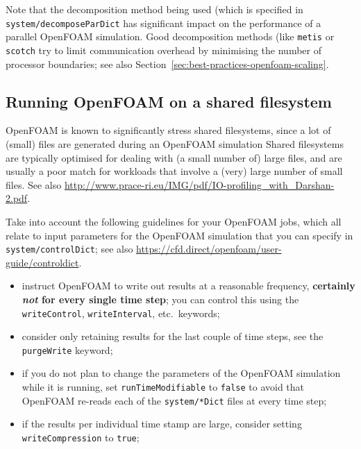 Note that the decomposition method being used (which is specified in {\small\texttt{system/decomposeParDict}}
has significant impact on the performance of a parallel OpenFOAM simulation. Good decomposition methods (like
{\small\texttt{metis}} or {\small\texttt{scotch}} try to limit communication overhead by minimising the number
of processor boundaries; see also Section~\ref{sec:best-practices-openfoam-scaling}.


\subsection{Running OpenFOAM on a shared filesystem}
\label{sec:best-practices-openfoam-shared-filesystems}

OpenFOAM is known to significantly stress shared filesystems, since a lot of (small) files are generated
during an OpenFOAM simulation Shared filesystems are typically optimised for dealing with (a small number of)
large files, and are usually a poor match for workloads that involve a (very) large number of small files.
See also {\small\url{http://www.prace-ri.eu/IMG/pdf/IO-profiling_with_Darshan-2.pdf}}.

Take into account the following guidelines for your OpenFOAM jobs, which all relate to input parameters
for the OpenFOAM simulation that you can specify in \texttt{\small{system/controlDict}};
see also {\small\url{https://cfd.direct/openfoam/user-guide/controldict}}.

\begin{itemize}
\item instruct OpenFOAM to write out results at a reasonable frequency, \textbf{certainly \textit{not}
for every single time step}; you can control this using the \texttt{\small{writeControl}},
\texttt{\small{writeInterval}}, etc.\ keywords;
\item consider only retaining results for the last couple of time steps, see the \texttt{\small{purgeWrite}} keyword;
\item if you do not plan to change the parameters of the OpenFOAM simulation while it is running,
      set \texttt{\small{runTimeModifiable}} to \texttt{\small{false}} to avoid that OpenFOAM re-reads each of
      the \texttt{\small{system/*Dict}} files at every time step;
\item if the results per individual time stamp are large, consider setting \texttt{\small{writeCompression}} to
      \texttt{\small{true}};
\end{itemize}

